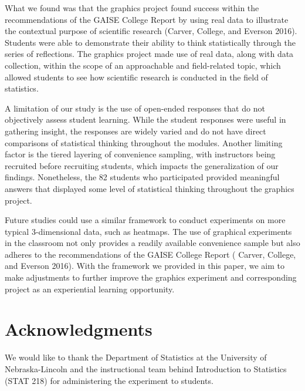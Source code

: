 \documentclass[
  12pt,
]{article}
\providecommand{\DIFdel}[1]{} %
\providecommand{\DIFadd}[1]{{\protect\color{blue} \sf #1}} %
\providecommand{\DIFdel}[1]{{\protect\color{red} [..\footnote{removed: #1} ]}} %
\providecommand{\DIFaddbegin}{} %
\providecommand{\DIFaddend}{} %
\providecommand{\DIFdelbegin}{} %
\providecommand{\DIFdelend}{} %
\newcommand{\DIFscaledelfig}{0.5}
\newlength{\DIFdelgraphicswidth} %
\newlength{\DIFdelgraphicsheight} %
\newcommand{\DIFaddincludegraphics}[2][]{{\color{blue}\fbox{\DIFOincludegraphics[#1]{#2}}}} %
\newcommand{\DIFdelincludegraphics}[2][]{%
\sbox{\DIFdelgraphicsbox}{\DIFOincludegraphics[#1]{#2}}%
\settoboxwidth{\DIFdelgraphicswidth}{\DIFdelgraphicsbox} %
\settoboxtotalheight{\DIFdelgraphicsheight}{\DIFdelgraphicsbox} %
\scalebox{\DIFscaledelfig}{%
\parbox[b]{\DIFdelgraphicswidth}{\usebox{\DIFdelgraphicsbox}\\[-\baselineskip] \rule{\DIFdelgraphicswidth}{0em}}\llap{\resizebox{\DIFdelgraphicswidth}{\DIFdelgraphicsheight}{%
\setlength{\unitlength}{\DIFdelgraphicswidth}%
\begin{picture}(1,1)%
\thicklines\linethickness{2pt} %
{\color[rgb]{1,0,0}\put(0,0){\framebox(1,1){}}}%
{\color[rgb]{1,0,0}\put(0,0){\line( 1,1){1}}}%
{\color[rgb]{1,0,0}\put(0,1){\line(1,-1){1}}}%
\end{picture}%
}\hspace*{3pt}}} %
} %
\DeclareRobustCommand{\DIFaddbegin}{\DIFOaddbegin \let\includegraphics\DIFaddincludegraphics} %
\DeclareRobustCommand{\DIFaddend}{\DIFOaddend \let\includegraphics\DIFOincludegraphics} %
\DeclareRobustCommand{\DIFdelbegin}{\DIFOdelbegin \let\includegraphics\DIFdelincludegraphics} %
\DeclareRobustCommand{\DIFdelend}{\DIFOaddend \let\includegraphics\DIFOincludegraphics} %
\begin{document}
\DIFaddend What we found was that the graphics project found success within the
recommendations of the GAISE College Report \DIFdelbegin \DIFdel{(\mbox{%
\citeproc{ref-carver}{Carver, College, and Everson 2016}}\hskip0pt%
}\DIFdelend \DIFaddbegin \DIFadd{by using real data to
illustrate the contextual purpose of scientific research (Carver,
College, and Everson 2016}\DIFaddend ). Students were able to demonstrate their
ability to think statistically through the series of reflections. The
graphics project made use of real data, along with data collection,
within the scope of an approachable and field-related topic, which
allowed \DIFdelbegin \DIFdel{for }\DIFdelend students to see how scientific research is conducted in the
field of statistics.

A limitation of our study is the use of open-ended responses that do not
objectively assess student learning. While the student responses were
useful in gathering insight, the responses are widely varied and do not
have direct comparisons of statistical thinking throughout the modules.
Another limiting factor is \DIFaddbegin \DIFadd{the }\DIFaddend tiered layering of convenience sampling,
with instructors being recruited before recruiting students, which
impacts the generalization of our findings. Nonetheless, the 82 students
who participated provided meaningful answers that displayed \DIFdelbegin \DIFdel{a }\DIFdelend \DIFaddbegin \DIFadd{some }\DIFaddend level
of statistical thinking throughout the graphics project.

Future studies could use a similar framework to conduct experiments on
more typical 3-dimensional data, such as heatmaps. The use of graphical
experiments in the classroom not only provides a readily available
convenience sample \DIFdelbegin \DIFdel{, }\DIFdelend but also adheres to the recommendations of the GAISE
College Report (\DIFdelbegin \DIFdel{\mbox{%
\citeproc{ref-carver}{Carver, College, and Everson
2016}}\hskip0pt%
}\DIFdelend \DIFaddbegin \DIFadd{Carver, College, and Everson 2016}\DIFaddend ). With the framework
we provided in this paper, we aim to make adjustments to further improve
the graphics experiment and corresponding project as an experiential
learning opportunity.

\section{Acknowledgments}\label{acknowledgments}

We would like to thank the Department of Statistics at \DIFaddbegin \DIFadd{the }\DIFaddend University of
Nebraska-Lincoln and the instructional team behind Introduction to
Statistics (STAT 218) for administering the experiment to students.
\end{document}
